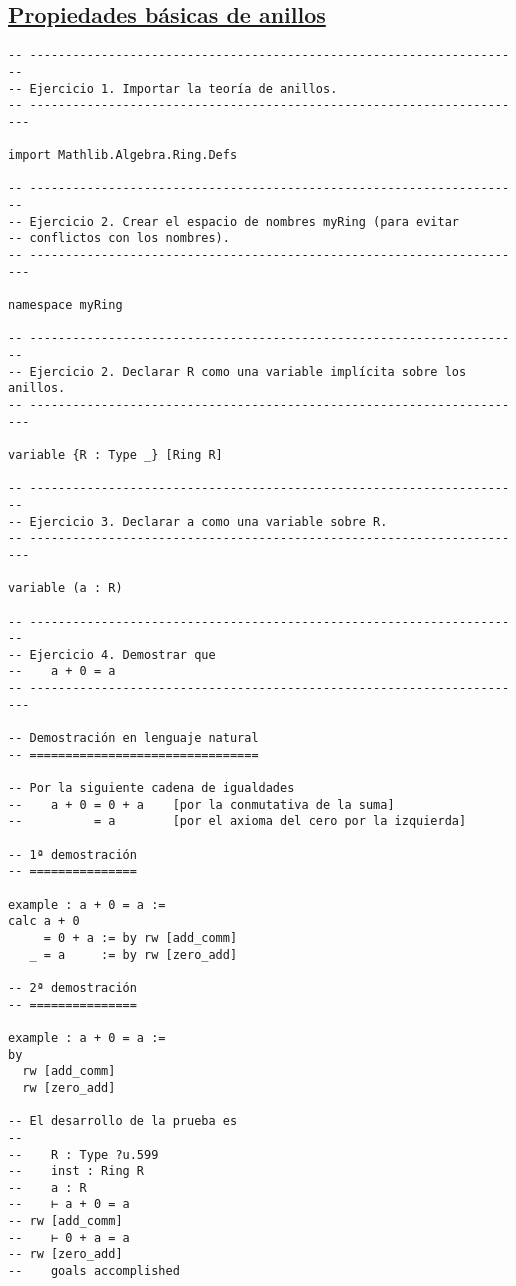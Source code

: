 \subsection{\href{./src/Basicos/Propiedades\_basicas\_de\_anillos.lean}{Propiedades básicas de anillos}}
\label{sec:orgc60116d}
\begin{verbatim}
-- ---------------------------------------------------------------------
-- Ejercicio 1. Importar la teoría de anillos.
-- ----------------------------------------------------------------------

import Mathlib.Algebra.Ring.Defs

-- ---------------------------------------------------------------------
-- Ejercicio 2. Crear el espacio de nombres myRing (para evitar
-- conflictos con los nombres).
-- ----------------------------------------------------------------------

namespace myRing

-- ---------------------------------------------------------------------
-- Ejercicio 2. Declarar R como una variable implícita sobre los anillos.
-- ----------------------------------------------------------------------

variable {R : Type _} [Ring R]

-- ---------------------------------------------------------------------
-- Ejercicio 3. Declarar a como una variable sobre R.
-- ----------------------------------------------------------------------

variable (a : R)

-- ---------------------------------------------------------------------
-- Ejercicio 4. Demostrar que
--    a + 0 = a
-- ----------------------------------------------------------------------

-- Demostración en lenguaje natural
-- ================================

-- Por la siguiente cadena de igualdades
--    a + 0 = 0 + a    [por la conmutativa de la suma]
--          = a        [por el axioma del cero por la izquierda]

-- 1ª demostración
-- ===============

example : a + 0 = a :=
calc a + 0
     = 0 + a := by rw [add_comm]
   _ = a     := by rw [zero_add]

-- 2ª demostración
-- ===============

example : a + 0 = a :=
by
  rw [add_comm]
  rw [zero_add]

-- El desarrollo de la prueba es
--
--    R : Type ?u.599
--    inst : Ring R
--    a : R
--    ⊢ a + 0 = a
-- rw [add_comm]
--    ⊢ 0 + a = a
-- rw [zero_add]
--    goals accomplished


\end{verbatim}
